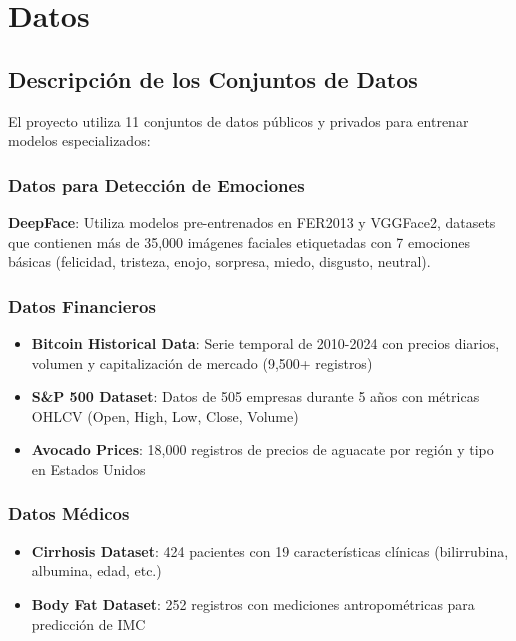 
\chapter{Datos}
\label{chap:data}
\pagestyle{fancy}

\section{Descripción de los Conjuntos de Datos}

El proyecto utiliza 11 conjuntos de datos públicos y privados para entrenar modelos especializados:

\subsection{Datos para Detección de Emociones}

\textbf{DeepFace}: Utiliza modelos pre-entrenados en FER2013 y VGGFace2, datasets que contienen más de 35,000 imágenes faciales etiquetadas con 7 emociones básicas (felicidad, tristeza, enojo, sorpresa, miedo, disgusto, neutral).

\subsection{Datos Financieros}

\begin{itemize}
    \item \textbf{Bitcoin Historical Data}: Serie temporal de 2010-2024 con precios diarios, volumen y capitalización de mercado (9,500+ registros)
    \item \textbf{S\&P 500 Dataset}: Datos de 505 empresas durante 5 años con métricas OHLCV (Open, High, Low, Close, Volume)
    \item \textbf{Avocado Prices}: 18,000 registros de precios de aguacate por región y tipo en Estados Unidos
\end{itemize}

\subsection{Datos Médicos}

\begin{itemize}
    \item \textbf{Cirrhosis Dataset}: 424 pacientes con 19 características clínicas (bilirrubina, albumina, edad, etc.)
    \item \textbf{Body Fat Dataset}: 252 registros con mediciones antropométricas para predicción de IMC
\end{itemize}

